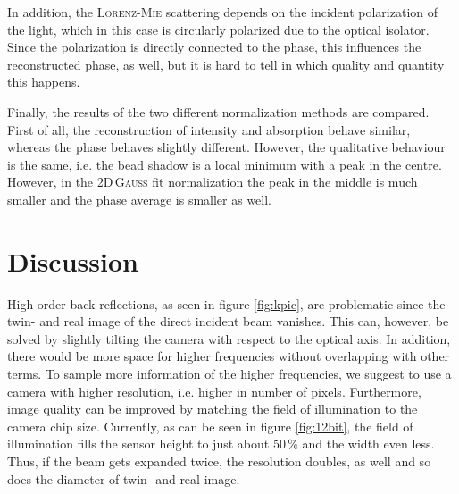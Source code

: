\documentclass{article}
\begin{document}
In addition, the \textsc{Lorenz}-\textsc{Mie} scattering depends on the incident polarization of the light, which in this case is circularly polarized due to the optical isolator. Since the polarization is directly connected to the phase, this influences the reconstructed phase, as well, but it is hard to tell in which quality and quantity this happens.

Finally, the results of the two different normalization methods are compared. First of all, the reconstruction of intensity and absorption behave similar, whereas the phase behaves slightly different. However, the qualitative behaviour is the same, i.e. the bead shadow is a local minimum with a peak in the centre. However, in the 2D\,\textsc{Gauss} fit normalization the peak in the middle is much smaller and the phase average is smaller as well.

\section{Discussion}
High order back reflections, as seen in figure \ref{fig:kpic}, are problematic since the twin- and real image of the direct incident beam vanishes. This can, however, be solved by slightly tilting the camera with respect to the optical axis.
In addition, there would be more space for higher frequencies without overlapping with other terms. To sample more information of the higher frequencies, we suggest to use a camera with higher resolution, i.e. higher in number of pixels. Furthermore, image quality can be improved by matching the field of illumination to the camera chip size. Currently, as can be seen in figure \ref{fig:12bit}, the field of illumination fills the sensor height to just about 50\,\% and the width even less. Thus, if the beam gets expanded twice, the resolution doubles, as well and so does the diameter of twin- and real image.
\end{document}
